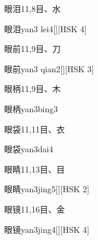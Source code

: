\begin{entry}{眼泪}{11,8}{⽬、⽔}
  \begin{phonetics}{眼泪}{yan3 lei4}[][HSK 4]
  \end{phonetics}
\end{entry}

\begin{entry}{眼前}{11,9}{⽬、⼑}
  \begin{phonetics}{眼前}{yan3 qian2}[][HSK 3]
  \end{phonetics}
\end{entry}

\begin{entry}{眼柄}{11,9}{⽬、⽊}
  \begin{phonetics}{眼柄}{yan3bing3}
  \end{phonetics}
\end{entry}

\begin{entry}{眼袋}{11,11}{⽬、⾐}
  \begin{phonetics}{眼袋}{yan3dai4}
  \end{phonetics}
\end{entry}

\begin{entry}{眼睛}{11,13}{⽬、⽬}
  \begin{phonetics}{眼睛}{yan3jing5}[][HSK 2]
  \end{phonetics}
\end{entry}

\begin{entry}{眼镜}{11,16}{⽬、⾦}
  \begin{phonetics}{眼镜}{yan3jing4}[][HSK 4]
  \end{phonetics}
\end{entry}

